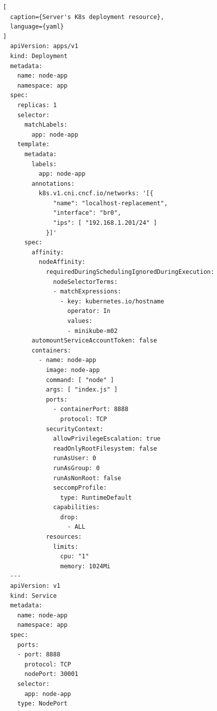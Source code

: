 \documentclass[english, 12pt, a4paper, sci, utf8, a-2b, online]{aaltothesis}
\begin{document}
\begin{lstlisting}[
  caption={Server's K8s deployment resource},
  language={yaml}
]
  apiVersion: apps/v1
  kind: Deployment
  metadata:
    name: node-app
    namespace: app
  spec:
    replicas: 1
    selector:
      matchLabels:
        app: node-app
    template:
      metadata:
        labels:
          app: node-app
        annotations:
          k8s.v1.cni.cncf.io/networks: '[{
              "name": "localhost-replacement",
              "interface": "br0",
              "ips": [ "192.168.1.201/24" ]
            }]'
      spec:
        affinity:
          nodeAffinity:
            requiredDuringSchedulingIgnoredDuringExecution:
              nodeSelectorTerms:
              - matchExpressions:
                - key: kubernetes.io/hostname
                  operator: In
                  values:
                  - minikube-m02
        automountServiceAccountToken: false
        containers:
          - name: node-app
            image: node-app
            command: [ "node" ]
            args: [ "index.js" ]
            ports:
              - containerPort: 8888
                protocol: TCP
            securityContext:
              allowPrivilegeEscalation: true
              readOnlyRootFilesystem: false
              runAsUser: 0
              runAsGroup: 0
              runAsNonRoot: false
              seccompProfile:
                type: RuntimeDefault
              capabilities:
                drop:
                  - ALL
            resources:
              limits:
                cpu: "1"
                memory: 1024Mi
  ---
  apiVersion: v1
  kind: Service
  metadata:
    name: node-app
    namespace: app
  spec:
    ports:
    - port: 8888
      protocol: TCP
      nodePort: 30001
    selector:
      app: node-app
    type: NodePort
\end{lstlisting}

\clearpage
\end{document}
